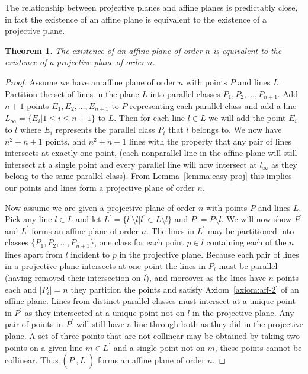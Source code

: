 \documentclass{article}
\newtheorem{theorem}{Theorem}
\begin{document}
The relationship between projective planes and affine planes is predictably close, in fact the existence of an affine plane is equivalent to the existence of a projective plane.

\begin{theorem}
  The existence of an affine plane of order \(n\) is equivalent to the existence of a projective plane of order \(n\).
\end{theorem}
\begin{proof}
  Assume we have an affine plane of order \(n\) with points \(P\) and lines \(L\). Partition the set of lines in the plane \(L\) into parallel classes \(P_{1}, P_{2}, \ldots, P_{n + 1}\). Add \(n + 1\) points \(E_{1}, E_{2}, \ldots, E_{n + 1}\) to \(P\) representing each parallel class and add a line \(L_{\infty} = \{E_{i} | 1 \le i \le n + 1\}\) to \(L\).
  Then for each line \(l \in L\) we will add the point \(E_{i}\) to \(l\) where \(E_{i}\) represents the parallel class \(P_{i}\) that \(l\) belongs to. We now have \(n^{2} + n + 1\) points, and \(n^{2} + n + 1\) lines with the property that any pair of lines intersects at exactly one point, (each nonparallel line in the affine plane will still intersect at a single point and every parallel line will now intersect at \(l_{\infty}\) as they belong to the same parallel class). From Lemma~\ref{lemma:easy-proj} this implies our points and lines form a projective plane of order \(n\).

  Now assume we are given a projective plane of order \(n\) with points \(P\) and lines \(L\). Pick any line \(l \in L\) and let \(L^{\prime} = \{l^{\prime} \setminus l | l^{\prime} \in L \setminus {l}\}\) and \(P^{\prime} = P \setminus l\). We will now show \(P^{\prime}\) and \(L^{\prime}\) forms an affine plane of order \(n\).
  The lines in \(L^{\prime}\) may be partitioned into classes \(\{P_{1}, P_{2}, \ldots, P_{n + 1}\}\), one class for each point \(p \in l\) containing each of the \(n\) lines apart from \(l\) incident to \(p\) in the projective plane. Because each pair of lines in a projective plane intersects at one point the lines in \(P_{i}\) must be parallel (having removed their intersection on \(l\)), and moreover as the lines have \(n\) points each and \(|P_{i}| = n\) they partition the points and satisfy Axiom~\ref{axiom:aff-2} of an affine plane.
  Lines from distinct parallel classes must intersect at a unique point in \(P^{\prime}\) as they intersected at a unique point not on \(l\) in the projective plane. Any pair of points in \(P^{\prime}\) will still have a line through both as they did in the projective plane. A set of three points that are not collinear may be obtained by taking two points on a given line \(m \in L^{\prime}\) and a single point not on \(m\), these points cannot be collinear. Thus \((P^{\prime}, L^{\prime})\) forms an affine plane of order \(n\).
\end{proof}
\end{document}
